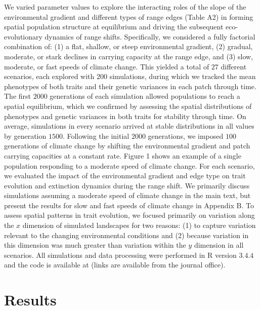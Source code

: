 \documentclass[11pt]{article}
\begin{document}
We varied parameter values to explore the interacting roles of the slope of the environmental gradient and different types of range edges (Table A2) in forming spatial population structure at equilibrium and driving the subsequent eco-evolutionary dynamics of range shifts. Specifically, we considered a fully factorial combination of: (1) a flat, shallow, or steep environmental gradient, (2) gradual, moderate, or stark declines in carrying capacity at the range edge, and (3) slow, moderate, or fast speeds of climate change. This yielded a total of $27$ different scenarios, each explored with $200$ simulations, during which we tracked the mean phenotypes of both traits and their genetic variances in each patch through time. The first $2000$ generations of each simulation allowed populations to reach a spatial equilibrium, which we confirmed by assessing the spatial distributions of phenotypes and genetic variances in both traits for stability through time. On average, simulations in every scenario arrived at stable distributions in all values by generation $1500$. Following the initial $2000$ generations, we imposed $100$ generations of climate change by shifting the environmental gradient and patch carrying capacities at a constant rate. Figure 1 shows an example of a single population responding to a moderate speed of climate change. For each scenario, we evaluated the impact of the environmental gradient and edge type on trait evolution and extinction dynamics during the range shift. We primarily discuss simulations assuming a moderate speed of climate change in the main text, but present the results for slow and fast speeds of climate change in Appendix B. To assess spatial patterns in trait evolution, we focused primarily on variation along the $x$ dimension of simulated landscapes for two reasons: (1) to capture variation relevant to the changing environmental conditions and (2) because variation in this dimension was much greater than variation within the $y$ dimension in all scenarios. All simulations and data processing were performed in R version $3.4.4$~\citep{team2000r} and the code is available at (links are available from the journal office).

\section*{Results}
\end{document}
